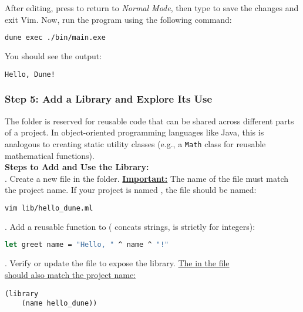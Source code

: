 \noindent
After editing, press  to return to \textit{Normal Mode}, then type  to save the changes and exit Vim.
Now, run the program using the following command:

\begin{lstlisting}[language=Bash, caption={Running the Program}]
    dune exec ./bin/main.exe
\end{lstlisting}

\noindent
You should see the output:
\begin{lstlisting}[language=Bash]
    Hello, Dune!
\end{lstlisting}


\subsubsection{Step 5: Add a Library and Explore Its Use}

The  folder is reserved for reusable code that can be shared across different parts of a project. 
In object-oriented programming languages like Java, this is analogous to creating static utility classes 
(e.g., a \texttt{Math} class for reusable mathematical functions).\\

\noindent
\textbf{Steps to Add and Use the Library:}\\

. Create a new file in the  folder. \underline{\textbf{Important:}} The name of the file must match the project name. 
   If your project is named , the file should be named:
   \begin{lstlisting}[language=Bash]
   vim lib/hello_dune.ml
   \end{lstlisting}

\vspace{.5em}
. Add a reusable function to  (\snippet{ \^} concats strings, \snippet{+} is strictly for integers):
   \begin{lstlisting}[language=OCaml]
   let greet name = "Hello, " ^ name ^ "!"
   \end{lstlisting}

\vspace{.5em}
. Verify or update the  file to expose the library. \underline{The  in the  file}\\
   \underline{should also match the project name:}
   \begin{lstlisting}[language=PlainText]
   (library
    (name hello_dune))
   \end{lstlisting}

